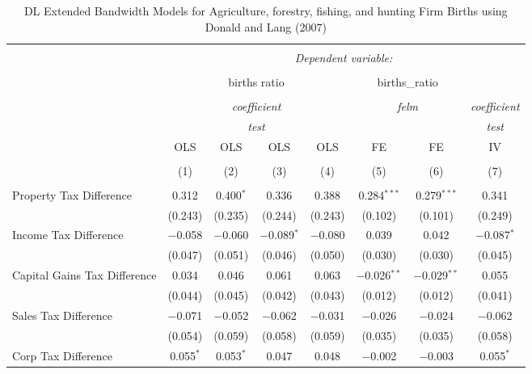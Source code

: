 
\begin{table}[!htbp] \centering 
  \caption{DL Extended Bandwidth Models for  Agriculture, forestry, fishing, and hunting Firm Births using Donald and Lang (2007)} 
  \label{} 
\begin{tabular}{@{\extracolsep{5pt}}lccccccc} 
\\[-1.8ex]\hline 
\hline \\[-1.8ex] 
 & \multicolumn{7}{c}{\textit{Dependent variable:}} \\ 
\cline{2-8} 
\\[-1.8ex] & \multicolumn{4}{c}{births ratio} & \multicolumn{2}{c}{births\_ratio} &   \\ 
\\[-1.8ex] & \multicolumn{4}{c}{\textit{coefficient}} & \multicolumn{2}{c}{\textit{felm}} & \textit{coefficient} \\ 
 & \multicolumn{4}{c}{\textit{test}} & \multicolumn{2}{c}{\textit{}} & \textit{test} \\ 
 & OLS & OLS & OLS & OLS & FE & FE & IV \\ 
\\[-1.8ex] & (1) & (2) & (3) & (4) & (5) & (6) & (7)\\ 
\hline \\[-1.8ex] 
 Property Tax Difference & 0.312 & 0.400$^{*}$ & 0.336 & 0.388 & 0.284$^{***}$ & 0.279$^{***}$ & 0.341 \\ 
  & (0.243) & (0.235) & (0.244) & (0.243) & (0.102) & (0.101) & (0.249) \\ 
  Income Tax Difference & $-$0.058 & $-$0.060 & $-$0.089$^{*}$ & $-$0.080 & 0.039 & 0.042 & $-$0.087$^{*}$ \\ 
  & (0.047) & (0.051) & (0.046) & (0.050) & (0.030) & (0.030) & (0.045) \\ 
  Capital Gains Tax Difference & 0.034 & 0.046 & 0.061 & 0.063 & $-$0.026$^{**}$ & $-$0.029$^{**}$ & 0.055 \\ 
  & (0.044) & (0.045) & (0.042) & (0.043) & (0.012) & (0.012) & (0.041) \\ 
  Sales Tax Difference & $-$0.071 & $-$0.052 & $-$0.062 & $-$0.031 & $-$0.026 & $-$0.024 & $-$0.062 \\ 
  & (0.054) & (0.059) & (0.058) & (0.059) & (0.035) & (0.035) & (0.058) \\ 
  Corp Tax Difference & 0.055$^{*}$ & 0.053$^{*}$ & 0.047 & 0.048 & $-$0.002 & $-$0.003 & 0.055$^{*}$ \\ 

\end{tabular}
\end{table}
